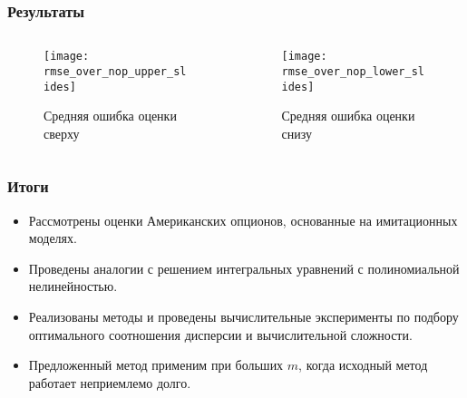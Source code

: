 \documentclass[unicode, notheorems]{beamer}
\begin{document}
\begin{frame}
    \frametitle{Результаты}
    \begin{columns}
        \begin{column}{0.5\textwidth}
            \begin{figure}[h]
                \centering
                \texttt{[image: rmse\_over\_nop\_upper\_slides]}
                \caption{Средняя ошибка оценки сверху}
                \label{fig:rmse_over_nop_standard_slides}
            \end{figure}
        \end{column}
        \begin{column}{0.5\textwidth}
            \begin{figure}[h]
                \centering
                \texttt{[image: rmse\_over\_nop\_lower\_slides]}
                \caption{Средняя ошибка оценки снизу}
                \label{fig:rmse_over_nop_random_subtree_slides}
            \end{figure}
        \end{column}
        
    \end{columns}
\end{frame}

\begin{frame}
    \frametitle{Итоги}
    \begin{itemize}
        \item Рассмотрены оценки Американских опционов, основанные на имитационных моделях.
        \item Проведены аналогии с решением интегральных уравнений с полиномиальной нелинейностью.
        \item Реализованы методы и проведены вычислительные эксперименты по подбору оптимального соотношения дисперсии и вычислительной сложности.
        \item Предложенный метод применим при больших $m$, когда исходный метод работает неприемлемо долго.
    \end{itemize}
\end{frame}
\end{document}
